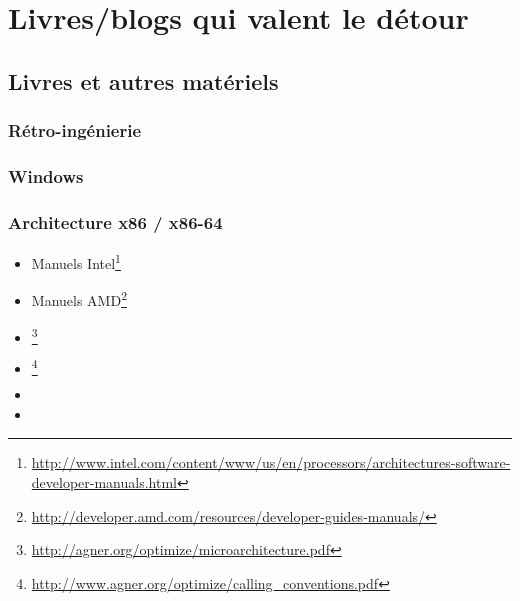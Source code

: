 \chapter{Livres/blogs qui valent le détour}

\section{Livres et autres matériels}

\subsection{Rétro-ingénierie}




\subsection{Windows}



\subsection{\CCpp}



\subsection{Architecture x86 / x86-64}

\label{x86_manuals}
\begin{itemize}
\item Manuels Intel\footnote{\AlsoAvailableAs \url{http://www.intel.com/content/www/us/en/processors/architectures-software-developer-manuals.html}}

\item Manuels AMD\footnote{\AlsoAvailableAs \url{http://developer.amd.com/resources/developer-guides-manuals/}}

\item \AgnerFog{}\footnote{\AlsoAvailableAs \url{http://agner.org/optimize/microarchitecture.pdf}}

\item \AgnerFogCC{}\footnote{\AlsoAvailableAs \url{http://www.agner.org/optimize/calling_conventions.pdf}}

\item \IntelOptimization

\item \AMDOptimization
\end{itemize}

